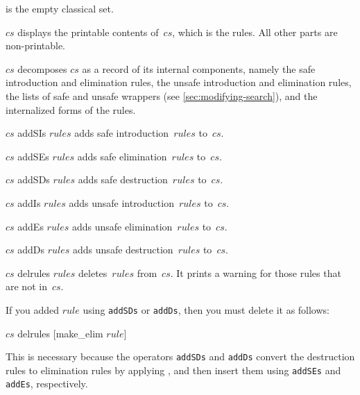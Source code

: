 \begin{ttdescription}
\item[\ttindexbold{empty_cs}] is the empty classical set.

\item[\ttindexbold{print_cs} $cs$] displays the printable contents of~$cs$,
  which is the rules. All other parts are non-printable.

\item[\ttindexbold{rep_cs} $cs$] decomposes $cs$ as a record of its internal 
  components, namely the safe introduction and elimination rules, the unsafe
  introduction and elimination rules, the lists of safe and unsafe wrappers
  (see \ref{sec:modifying-search}), and the internalized forms of the rules.

\item[$cs$ addSIs $rules$] 
adds safe introduction~$rules$ to~$cs$.

\item[$cs$ addSEs $rules$] 
adds safe elimination~$rules$ to~$cs$.

\item[$cs$ addSDs $rules$] 
adds safe destruction~$rules$ to~$cs$.

\item[$cs$ addIs $rules$] 
adds unsafe introduction~$rules$ to~$cs$.

\item[$cs$ addEs $rules$] 
adds unsafe elimination~$rules$ to~$cs$.

\item[$cs$ addDs $rules$] 
adds unsafe destruction~$rules$ to~$cs$.

\item[$cs$ delrules $rules$] 
deletes~$rules$ from~$cs$.  It prints a warning for those rules that are not
in~$cs$.
\end{ttdescription}

\begin{warn}
  If you added $rule$ using \texttt{addSDs} or \texttt{addDs}, then you must delete
  it as follows:
\begin{ttbox}
\(cs\) delrules [make_elim \(rule\)]
\end{ttbox}
\par\noindent
This is necessary because the operators \texttt{addSDs} and \texttt{addDs} convert
the destruction rules to elimination rules by applying ,
and then insert them using \texttt{addSEs} and \texttt{addEs}, respectively.
\end{warn}

